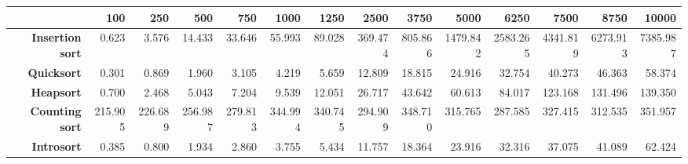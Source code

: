 \begin{tabular}{rrrrrrrrrrrrrr}
\hline
                         &   \textbf{100} &   \textbf{250} &   \textbf{500} &   \textbf{750} &   \textbf{1000} &   \textbf{1250} &   \textbf{2500} &   \textbf{3750} &   \textbf{5000} &   \textbf{6250} &   \textbf{7500} &   \textbf{8750} &   \textbf{10000} \\
\hline
 \textbf{Insertion sort} &          0.623 &          3.576 &         14.433 &         33.646 &          55.993 &          89.028 &         369.474 &         805.866 &        1479.842 &        2583.265 &        4341.819 &        6273.913 &         7385.987 \\
      \textbf{Quicksort} &          0.301 &          0.869 &          1.960 &          3.105 &           4.219 &           5.659 &          12.809 &          18.815 &          24.916 &          32.754 &          40.273 &          46.363 &           58.374 \\
       \textbf{Heapsort} &          0.700 &          2.468 &          5.043 &          7.204 &           9.539 &          12.051 &          26.717 &          43.642 &          60.613 &          84.017 &         123.168 &         131.496 &          139.350 \\
  \textbf{Counting sort} &        215.905 &        226.689 &        256.987 &        279.813 &         344.994 &         340.745 &         294.909 &         348.710 &         315.765 &         287.585 &         327.415 &         312.535 &          351.957 \\
      \textbf{Introsort} &          0.385 &          0.800 &          1.934 &          2.860 &           3.755 &           5.434 &          11.757 &          18.364 &          23.916 &          32.316 &          37.075 &          41.089 &           62.424 \\
\hline
\end{tabular}